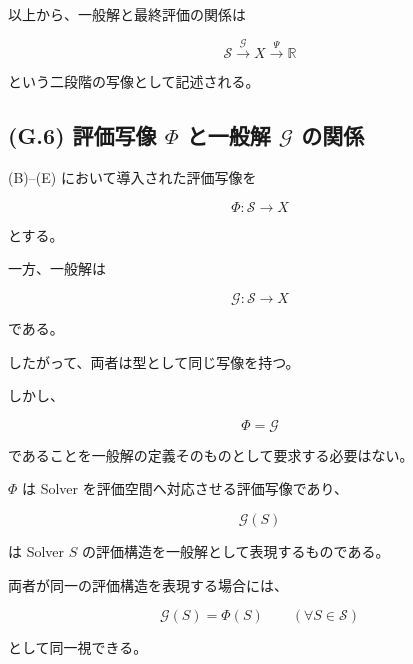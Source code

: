 \documentclass[a4paper,11pt]{article}
\begin{document}
以上から、一般解と最終評価の関係は

\begin{equation}
    \boxed{
        \mathcal{S}
        \xrightarrow{\mathcal{G}}
        X
        \xrightarrow{\Psi}
        \mathbb{R}
    }
    \label{eq:G-evaluation-chain}
\end{equation}

という二段階の写像として記述される。


\subsection{(G.6) 評価写像 $\Phi$ と一般解 $\mathcal{G}$ の関係}
\label{subsec:G6}

(B)--(E) において導入された評価写像を

\begin{equation}
    \Phi:
    \mathcal{S}
    \longrightarrow
    X
\end{equation}

とする。

一方、一般解は

\begin{equation}
    \mathcal{G}:
    \mathcal{S}
    \longrightarrow
    X
\end{equation}

である。

したがって、両者は型として同じ写像を持つ。

しかし、

\begin{equation}
    \Phi=\mathcal{G}
\end{equation}

であることを一般解の定義そのものとして要求する必要はない。

$\Phi$ は Solver を評価空間へ対応させる評価写像であり、

\begin{equation}
    \mathcal{G}(S)
\end{equation}

は Solver $S$ の評価構造を一般解として表現するものである。

両者が同一の評価構造を表現する場合には、

\begin{equation}
    \mathcal{G}(S)
    =
    \Phi(S)
    \qquad
    (\forall S\in\mathcal{S})
\end{equation}

として同一視できる。
\end{document}
